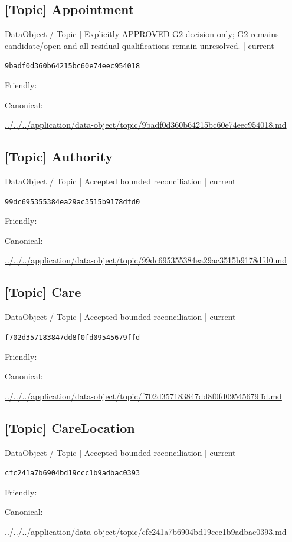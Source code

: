\documentclass[10pt,a4paper]{article}
\begin{document}
\subsection*{[Topic] Appointment}
{\small DataObject / Topic | Explicitly APPROVED G2 decision only; G2 remains candidate/open and all residual qualifications remain unresolved. | current}\par
\texttt{9badf0d360b64215bc60e74eec954018}\par
Friendly: \par
Canonical: \par
{\footnotesize\url{../../../application/data-object/topic/9badf0d360b64215bc60e74eec954018.md}}\par
\subsection*{[Topic] Authority}
{\small DataObject / Topic | Accepted bounded reconciliation | current}\par
\texttt{99dc695355384ea29ac3515b9178dfd0}\par
Friendly: \par
Canonical: \par
{\footnotesize\url{../../../application/data-object/topic/99dc695355384ea29ac3515b9178dfd0.md}}\par
\subsection*{[Topic] Care}
{\small DataObject / Topic | Accepted bounded reconciliation | current}\par
\texttt{f702d357183847dd8f0fd09545679ffd}\par
Friendly: \par
Canonical: \par
{\footnotesize\url{../../../application/data-object/topic/f702d357183847dd8f0fd09545679ffd.md}}\par
\subsection*{[Topic] CareLocation}
{\small DataObject / Topic | Accepted bounded reconciliation | current}\par
\texttt{cfc241a7b6904bd19ccc1b9adbac0393}\par
Friendly: \par
Canonical: \par
{\footnotesize\url{../../../application/data-object/topic/cfc241a7b6904bd19ccc1b9adbac0393.md}}\par
\end{document}
